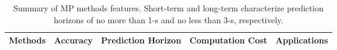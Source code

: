 \begin{table}[h]
	\centering
	\captionsetup{justification=justified}
	\caption[Summary of \ac{MP} methods features]{Summary of \ac{MP} methods features. Short-term and long-term characterize prediction horizons of no more than 1-s and no less than 3-s, respectively.}
	\begin{adjustbox}{max width=\textwidth}
		\begin{tabular}{c | c c c c }
			\toprule
			Methods & Accuracy & Prediction Horizon & Computation Cost & Applications \\
			\midrule
			

\end{tabular}
\end{adjustbox}
\end{table}

